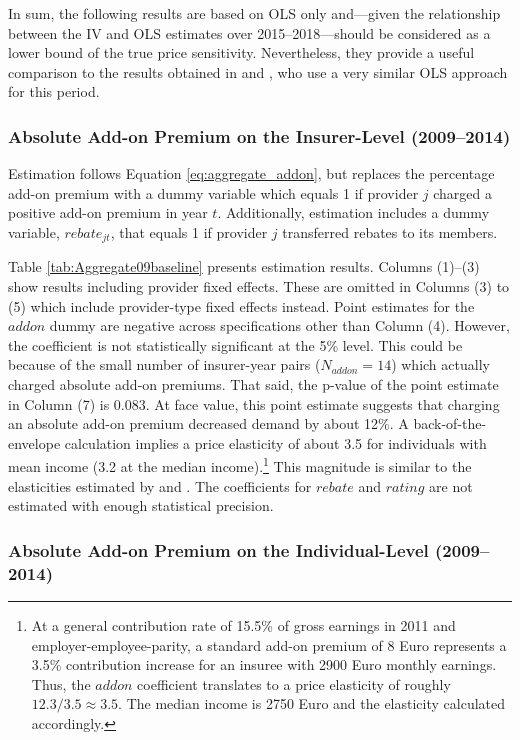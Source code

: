 \documentclass[a4paper, 11pt, english]{article}
\begin{document}
In sum, the following results are based on OLS only and---given the relationship between the IV and OLS estimates over 2015--2018---should be considered as a lower bound of the true price sensitivity. Nevertheless, they provide a useful comparison to the results obtained in \citet{Pendzialek2015} and \citet{Schmitz2017}, who use a very similar OLS approach for this period.

\subsubsection*{Absolute Add-on Premium on the Insurer-Level (2009--2014)}

Estimation follows Equation \eqref{eq:aggregate_addon}, but replaces the percentage add-on premium with a dummy variable which equals 1 if provider $j$ charged a positive add-on premium in year $t$. Additionally, estimation includes a dummy variable, $rebate_{jt}$, that equals 1 if provider $j$ transferred rebates to its members.

Table \ref{tab:Aggregate09baseline} presents estimation results. Columns (1)--(3) show results including provider fixed effects. These are omitted in Columns (3) to (5) which include provider-type fixed effects instead. Point estimates for the $addon$ dummy are negative across specifications other than Column (4). However, the coefficient is not statistically significant at the 5\% level. This could be because of the small number of insurer-year pairs ($N_{addon} = 14$) which actually charged absolute add-on premiums. That said, the p-value of the point estimate in Column (7) is 0.083. At face value, this point estimate suggests that charging an absolute add-on premium decreased demand by about 12\%. A back-of-the-envelope calculation implies a price elasticity of about 3.5 for individuals with mean income (3.2 at the median income).\footnote{At a general contribution rate of 15.5\% of gross earnings in 2011 and employer-employee-parity, a standard add-on premium of 8 Euro represents a 3.5\% contribution increase for an insuree with 2900 Euro monthly earnings. Thus, the $addon$ coefficient translates to a price elasticity of roughly $12.3/3.5 \approx 3.5$. The median income is 2750 Euro and the elasticity calculated accordingly.} This magnitude is similar to the elasticities estimated by \citet{Pendzialek2015} and \cite{Schmitz2017}. The coefficients for $rebate$ and $rating$ are not estimated with enough statistical precision. 

\subsubsection*{Absolute Add-on Premium on the Individual-Level (2009--2014)}
\end{document}

